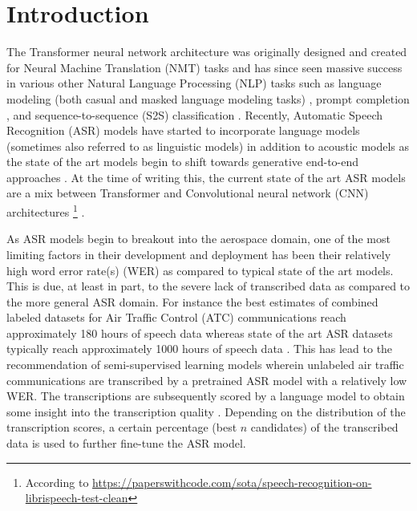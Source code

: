 \documentclass[10pt]{article}
\begin{document}
    \section{Introduction}
        The Transformer neural network architecture was originally designed and created for Neural Machine
        Translation (NMT) tasks \cite{vaswani_attention_2017} and has since seen massive success in various
        other Natural Language Processing (NLP) tasks such as language modeling (both casual and masked language
        modeling tasks) \cite{devlin_bert_2019}, prompt completion \cite{radford_improving_2018}, and
        sequence-to-sequence (S2S) classification \cite{lewis_bart_2019}.
        Recently, Automatic Speech Recognition (ASR) models have started to incorporate language models
        \cite{badrinath_automatic_2022} (sometimes also referred to as linguistic models) in addition to
        acoustic models \cite{li2019jasper} as the state of the art models begin to shift towards generative
        end-to-end approaches \cite{hannun2014deep}.
        At the time of writing this, the current state of the art ASR models are a mix between Transformer
        and Convolutional neural network (CNN) architectures
        \footnote{According to \url{https://paperswithcode.com/sota/speech-recognition-on-librispeech-test-clean}} \cite{baevski2020wav2vec}.


        As ASR models begin to breakout into the aerospace domain, one of the most limiting factors in their
        development and deployment has been their relatively high word error rate(s) (WER)
        \cite{vsmidl2019air,juan2020automatic,badrinath_automatic_2022} as compared to typical state of the art models.
        This is due, at least in part, to the severe lack of transcribed data as compared to the more general ASR domain.
        For instance the best estimates of combined labeled datasets for Air Traffic Control (ATC)
        communications reach approximately 180 hours of speech data \cite{juan2020automatic} whereas
        state of the art ASR datasets typically reach approximately 1000 hours of speech data \cite{librispeech_2015}.
        This has lead to the recommendation of semi-supervised learning models wherein unlabeled air
        traffic communications are transcribed by a pretrained ASR model with a relatively low WER.
        The transcriptions are subsequently scored by a language model to obtain some insight into the
        transcription quality \cite{badrinath_automatic_2022,zuluaga2021contextual}.
        Depending on the distribution of the transcription scores, a certain percentage (best $n$ candidates)
        of the transcribed data is used to further fine-tune the ASR model.
\end{document}
